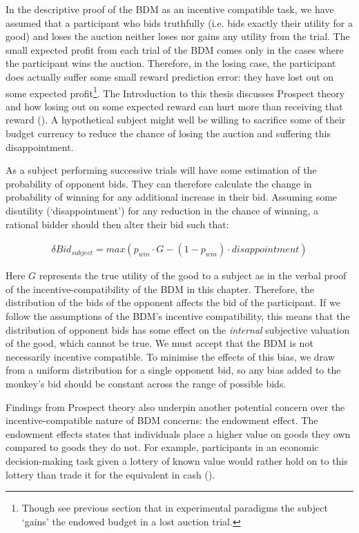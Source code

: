 In the descriptive proof of the BDM as an incentive compatible task, we have assumed that a participant who bids truthfully (i.e. bids exactly their utility for a good) and loses the auction neither loses nor gains any utility from the trial. The small expected profit from each trial of the BDM comes only in the cases where the participant wins the auction. Therefore, in the losing case, the participant does actually suffer some small reward prediction error: they have lost out on some expected profit\footnote{Though see previous section that in experimental paradigms the subject ‘gains’ the endowed budget in a lost auction trial.}. The Introduction to this thesis discusses Prospect theory and how losing out on some expected reward can hurt more than receiving that reward (\cite{kahnemanProspectTheoryAnalysis1979}). A hypothetical subject might well be willing to sacrifice some of their budget currency to reduce the chance of losing the auction and suffering this disappointment.

As a subject performing successive trials will have some estimation of the probability of opponent bids. They can therefore calculate the change in probability of winning for any additional increase in their bid. Assuming some disutility (‘disappointment’) for any reduction in the chance of winning, a rational bidder should then alter their bid such that:

\begin{equation}
\begin{aligned}
\delta Bid_{subject} = max(p_{win} \cdot G - (1 - p_{win}) \cdot disappointment)
\end{aligned}
\label{eq:bdm_disappointment}
\end{equation}

Here $G$ represents the true utility of the good to a subject as in the verbal proof of the incentive-compatibility of the BDM in this chapter. Therefore, the distribution of the bids of the opponent affects the bid of the participant. If we follow the assumptions of the BDM’s incentive compatibility, this means that the distribution of opponent bids has some effect on the \textit{internal} subjective valuation of the good, which cannot be true. We must accept that the BDM is not necessarily incentive compatible. To minimise the effects of this bias, we draw from a uniform distribution for a single opponent bid, so any bias added to the monkey’s bid should be constant across the range of possible bids.

Findings from Prospect theory also underpin another potential concern over the incentive-compatible nature of BDM concerns: the endowment effect. The endowment effects states that individuals place a higher value on goods they own compared to goods they do not. For example, participants in an economic decision-making task given a lottery of known value would rather hold on to this lottery than trade it for the equivalent in cash (\cite{kahnemanAnomaliesEndowmentEffect1991}).

